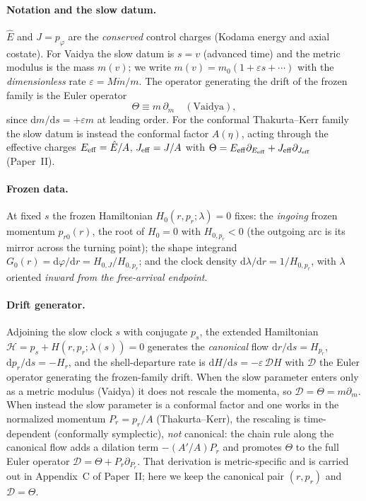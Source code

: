 \documentclass[12pt]{iopart}
\newcommand{\Ehat}{\hat E}
\newcommand{\dd}{\mathrm{d}}
\begin{document}
\paragraph{Notation and the slow datum.} $\Ehat$ and $J=p_\varphi$ are the
\emph{conserved} control charges (Kodama energy and axial costate). For Vaidya the slow
datum is $s=v$ (advanced time) and the metric modulus is the mass $m(v)$; we write
$m(v)=m_0(1+\varepsilon s+\cdots)$ with the \emph{dimensionless} rate
$\varepsilon=M\dot m/m$. The operator generating the drift of the frozen family is the
Euler operator
\begin{equation}
    \Theta\equiv m\,\partial_m\quad(\text{Vaidya}),
    \label{eq:theta-op}
\end{equation}
since $\dd m/\dd s=+\varepsilon m$ at leading order. For the conformal Thakurta--Kerr
family the slow datum is instead the conformal factor $A(\eta)$, acting through the
effective charges $E_{\rm eff}=\Ehat/A$, $J_{\rm eff}=J/A$ with
$\Theta=E_{\rm eff}\partial_{E_{\rm eff}}+J_{\rm eff}\partial_{J_{\rm eff}}$ (Paper~II).

\paragraph{Frozen data.} At fixed $s$ the frozen Hamiltonian $H_0(r,p_r;\lambda)=0$
fixes: the \emph{ingoing} frozen momentum $p_{r0}(r)$, the root of $H_0=0$ with
$H_{0,p_r}<0$ (the outgoing arc is its mirror across the turning point); the shape
integrand $G_0(r)=\dd\varphi/\dd r=H_{0,J}/H_{0,p_r}$; and the clock density
$\dd\lambda/\dd r=1/H_{0,p_r}$, with $\lambda$ oriented \emph{inward from the
free-arrival endpoint}.

\paragraph{Drift generator.} Adjoining the slow clock $s$ with conjugate $p_s$, the
extended Hamiltonian $\mathcal H=p_s+H(r,p_r;\lambda(s))=0$ generates the \emph{canonical}
flow $\dd r/\dd s=H_{p_r}$, $\dd p_r/\dd s=-H_r$, and the shell-departure rate is
$\dd H/\dd s=-\varepsilon\,\mathcal D H$ with $\mathcal D$ the Euler operator generating
the frozen-family drift. When the slow parameter enters only as a metric modulus
(Vaidya) it does not rescale the momenta, so $\mathcal D=\Theta=m\partial_m$. When
instead the slow parameter is a conformal factor and one works in the normalized
momentum $P_r=p_r/A$ (Thakurta--Kerr), the rescaling is time-dependent (conformally
symplectic), \emph{not} canonical: the chain rule along the canonical flow adds a
dilation term $-(A'/A)P_r$ and promotes $\Theta$ to the full Euler operator
$\mathcal D=\Theta+P_r\partial_{P_r}$. That derivation is metric-specific and is carried
out in Appendix~C of Paper~II; here we keep the canonical pair $(r,p_r)$ and
$\mathcal D=\Theta$.
\end{document}

